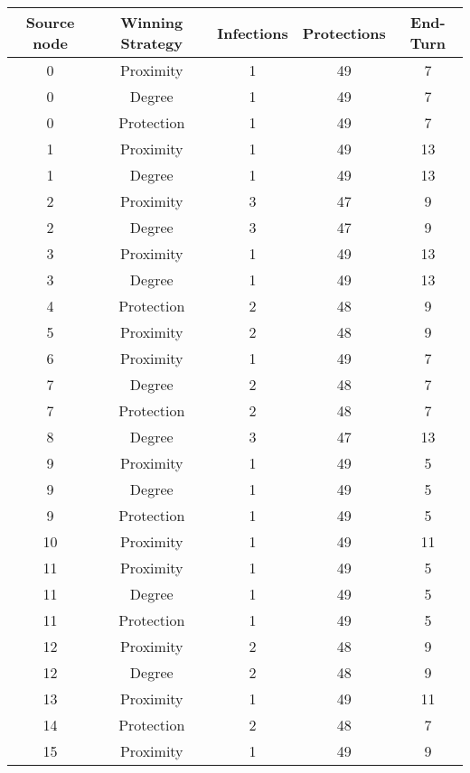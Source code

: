 \documentclass[results.tex]{subfiles}
\begin{document}
\begin{center}
  \begin{tabular}{| c || c | c | c | c |}
    \hline
    {\bfseries Source node} & {\bfseries Winning Strategy} & {\bfseries Infections} & {\bfseries Protections} & {\bfseries End-Turn} \\  %
    \hline\hline
    0 & Proximity & 1 & 49 & 7 \\ 
    \hline
    0 & Degree & 1 & 49 & 7 \\ 
    \hline
    0 & Protection & 1 & 49 & 7 \\ 
    \hline
    1 & Proximity & 1 & 49 & 13 \\ 
    \hline
    1 & Degree & 1 & 49 & 13 \\ 
    \hline
    2 & Proximity & 3 & 47 & 9 \\ 
    \hline
    2 & Degree & 3 & 47 & 9 \\ 
    \hline
    3 & Proximity & 1 & 49 & 13 \\ 
    \hline
    3 & Degree & 1 & 49 & 13 \\ 
    \hline
    4 & Protection & 2 & 48 & 9 \\ 
    \hline
    5 & Proximity & 2 & 48 & 9 \\ 
    \hline
    6 & Proximity & 1 & 49 & 7 \\ 
    \hline
    7 & Degree & 2 & 48 & 7 \\ 
    \hline
    7 & Protection & 2 & 48 & 7 \\ 
    \hline
    8 & Degree & 3 & 47 & 13 \\ 
    \hline
    9 & Proximity & 1 & 49 & 5 \\ 
    \hline
    9 & Degree & 1 & 49 & 5 \\ 
    \hline
    9 & Protection & 1 & 49 & 5 \\ 
    \hline
    10 & Proximity & 1 & 49 & 11 \\ 
    \hline
    11 & Proximity & 1 & 49 & 5 \\ 
    \hline
    11 & Degree & 1 & 49 & 5 \\ 
    \hline
    11 & Protection & 1 & 49 & 5 \\ 
    \hline
    12 & Proximity & 2 & 48 & 9 \\ 
    \hline
    12 & Degree & 2 & 48 & 9 \\ 
    \hline
    13 & Proximity & 1 & 49 & 11 \\ 
    \hline
    14 & Protection & 2 & 48 & 7 \\ 
    \hline
    15 & Proximity & 1 & 49 & 9 \\ 

\end{tabular}
\end{center}
\end{document}
